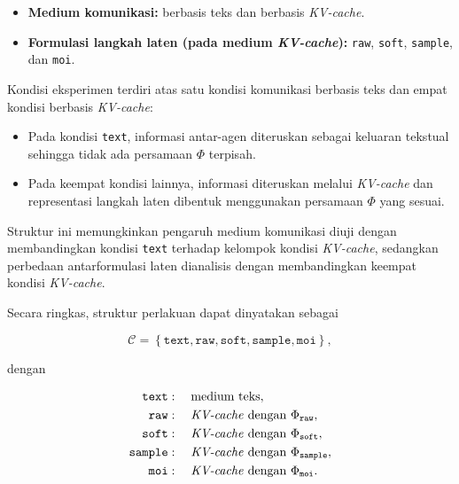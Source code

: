 \begin{itemize}
    \item \textbf{Medium komunikasi:} berbasis teks dan berbasis
    \textit{KV-cache}.
    \item \textbf{Formulasi langkah laten (pada medium \textit{KV-cache}):}
    \texttt{raw}, \texttt{soft}, \texttt{sample}, dan \texttt{moi}.
\end{itemize}

Kondisi eksperimen terdiri atas satu kondisi komunikasi berbasis teks
dan empat kondisi berbasis \textit{KV-cache}:

\begin{itemize}
    \item Pada kondisi \texttt{text}, informasi antar-agen diteruskan
    sebagai keluaran tekstual sehingga tidak ada persamaan $\Phi$
    terpisah.
    \item Pada keempat kondisi lainnya, informasi diteruskan melalui
    \textit{KV-cache} dan representasi langkah laten dibentuk
    menggunakan persamaan $\Phi$ yang sesuai.
\end{itemize}

Struktur ini memungkinkan pengaruh medium komunikasi diuji dengan
membandingkan kondisi \texttt{text} terhadap kelompok kondisi
\textit{KV-cache}, sedangkan perbedaan antarformulasi laten dianalisis
dengan membandingkan keempat kondisi \textit{KV-cache}.

Secara ringkas, struktur perlakuan dapat dinyatakan sebagai

\begin{equation}
\mathcal{C}
=
\left\{
\texttt{text},
\texttt{raw},
\texttt{soft},
\texttt{sample},
\texttt{moi}
\right\},
\label{eq:kondisi-eksperimen}
\end{equation}

dengan

\begin{equation}
\begin{aligned}
\texttt{text}
&:\quad \text{medium teks},\\
\texttt{raw}
&:\quad \text{\textit{KV-cache} dengan }\Phi_{\texttt{raw}},\\
\texttt{soft}
&:\quad \text{\textit{KV-cache} dengan }\Phi_{\texttt{soft}},\\
\texttt{sample}
&:\quad \text{\textit{KV-cache} dengan }\Phi_{\texttt{sample}},\\
\texttt{moi}
&:\quad \text{\textit{KV-cache} dengan }\Phi_{\texttt{moi}}.
\end{aligned}
\label{eq:definisi-kondisi}
\end{equation}

